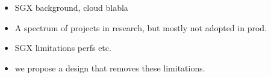 \begin{itemize}

\item SGX background, cloud blabla

\item A spectrum of projects in research, but mostly not adopted in prod.

\item SGX limitations perfs etc.

\item we propose a design that removes these limitations.

\end{itemize}

